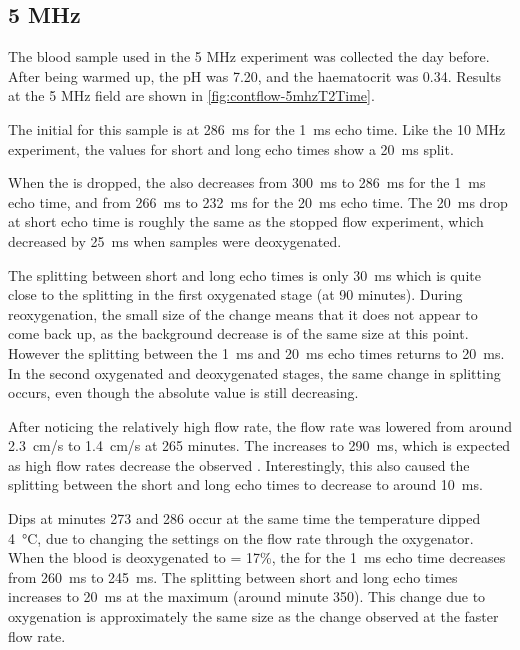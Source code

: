 \subsection{5 MHz}


The blood sample used in the 5 MHz experiment was collected the day before.
After being warmed up, the pH was 7.20, and the haematocrit was 0.34.
Results at the 5 MHz field are shown in \autoref{fig:contflow-5mhzT2Time}.

The initial \Ttwo for this sample is at \SI{286}{ms} for the \SI{1}{ms} echo time.
Like the 10 MHz experiment, the \Ttwo values for  short and long echo times show a \SI{20}{ms} split.

When the \SOtwo is dropped, the \Ttwo also decreases from \SI{300}{ms} to \SI{286}{ms} for the \SI{1}{ms} echo time, and from \SI{266}{ms} to \SI{232}{ms} for the \SI{20}{ms} echo time.
The \SI{20}{ms} drop at short echo time is roughly the same as the stopped flow experiment, which decreased by \SI{25}{ms} when samples were deoxygenated.

The splitting between short and long echo times is only \SI{30}{ms} which is quite close to the splitting in the first oxygenated stage (at 90 minutes).
During reoxygenation, the small size of the \Ttwo change means that it does not appear to come back up, as the background \Ttwo decrease is of the same size at this point.
However the splitting between the \SI{1}{ms} and \SI{20}{ms} echo times returns to \SI{20}{ms}.
In the second oxygenated and deoxygenated stages, the same change in splitting occurs, even though the absolute \Ttwo value is still decreasing.

After noticing the relatively high flow rate, the flow rate was lowered from around \SI{2.3}{cm/s} to \SI{1.4}{cm/s} at 265 minutes.
The \Ttwo increases to \SI{290}{ms}, which is expected as high flow rates decrease the observed \Ttwo.
Interestingly, this also caused the splitting between the short and long echo times to decrease to around \SI{10}{ms}.

Dips at minutes 273 and 286 occur at the same time the temperature dipped \SI{4}{\celsius}, due to changing the settings on the flow rate through the oxygenator.
When the blood is deoxygenated to \SOtwo = 17\%,  the \Ttwo for the \SI{1}{ms} echo time decreases from \SI{260}{ms} to \SI{245}{ms}.
The splitting between short and long echo times increases to \SI{20}{ms} at the maximum (around minute 350).
This \Ttwo change due to oxygenation is approximately the same size as the change observed at the faster flow rate.

